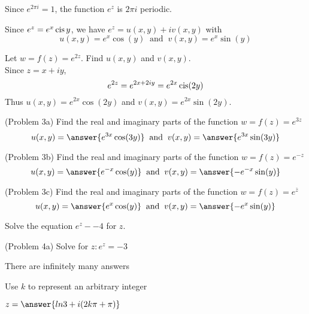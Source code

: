 \documentclass[handout]{ximera}
\begin{document}
\begin{remark}
Since $e^{2\pi i} = 1$, the function $e^z$ is $2\pi i$ periodic.
\end{remark}

Since $e^z = e^x \operatorname{cis} y$, we have $e^z = u(x,y) + iv(x,y)$ with
\[
u(x,y) = e^x\cos(y) \;\; \mbox{and} \;\; v(x,y)= e^x\sin(y)
\]




\begin{example}[Example 3] 
Let $w = f(z) = e^{2z}$. Find $u(x,y)$ and $v(x,y)$.\\
Since $z = x+iy$, 
\[
e^{2z} = e^{2x+2iy} = e^{2x}\operatorname{cis}(2y)
\]
Thus $u(x,y) = e^{2x}\cos(2y)$ and $v(x,y) = e^{2x}\sin(2y)$.

\end{example}



\begin{problem}(Problem 3a)
Find the real and imaginary parts of the function $w = f(z) = e^{3z}$
\[
u(x,y) = \answer{e^{3x}\cos(3y)} \;\; \mbox{and} \;\; v(x,y) = \answer{e^{3x}\sin(3y)}
\]

\end{problem}

\begin{problem}(Problem 3b)
Find the real and imaginary parts of the function $w = f(z) = e^{-z}$
\[
u(x,y) = \answer{e^{-x}\cos(y)} \;\; \mbox{and} \;\; v(x,y) = \answer{-e^{-x}\sin(y)}
\]

\end{problem}

\begin{problem}(Problem 3c)
Find the real and imaginary parts of the function $w = f(z) = e^{\overline{z}}$
\[
u(x,y) = \answer{e^x\cos(y)} \;\; \mbox{and} \;\; v(x,y) = \answer{-e^x\sin(y)}
\]



\end{problem}

\begin{example}[Example 4] 
Solve the equation $e^z - -4$ for $z$.\\


\end{example}



\begin{problem}(Problem 4a)
Solve for $z: e^z = -3$\\
\begin{hint}
There are infinitely many answers
\end{hint}
\begin{hint}
Use $k$ to represent an arbitrary integer
\end{hint}
$z = \answer{ln 3 + i(2k\pi + \pi)}$
\end{problem}
\end{document}
